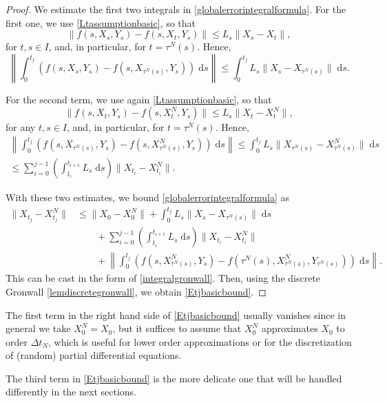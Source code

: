 \documentclass[reqno,12pt]{amsart}
\theoremstyle{plain} %
\theoremstyle{definition} %
\begin{document}
\begin{proof}
    We estimate the first two integrals in \eqref{globalerrorintegralformula}. For the first one, we use \eqref{Ltassumptionbasic}, so that
    $$
        \|f(s, X_s, Y_s) - f(s, X_t, Y_s)\| \leq L_s \|X_s - X_t\|,
    $$
    for $t, s \in I$, and, in particular, for $t = \tau^N(s)$. Hence,
    $$
        \left\|\int_0^{t_j} \left( f(s, X_s, Y_s) - f(s, X_{\tau^N(s)}, Y_s) \right)\;\mathrm{d}s \right\| \leq \int_0^{t_j} L_s \|X_s - X_{\tau^N(s)}\| \;\mathrm{d}s.
    $$
    
    For the second term, we use again \eqref{Ltassumptionbasic}, so that
    $$
        \|f(s, X_t, Y_s) - f(s, X_t^N, Y_s)\| \leq L_s \|X_t - X_t^N\|,
    $$
    for any $t, s \in I$, and, in particular, for $t = \tau^N(s)$. Hence,
    \begin{multline*}
        \left\|\int_0^{t_j} \left( f(s, X_{\tau^N(s)}, Y_s) - f(s, X_{\tau^N(s)}^N, Y_s) \right)\;\mathrm{d}s \right\| \leq \int_0^{t_j} L_s \|X_{\tau^N(s)} - X_{\tau^N(s)}^N\| \;\mathrm{d}s \\
        \leq \sum_{i=0}^{j-1} \left(\int_{t_i}^{t_{i+1}}L_s\;\mathrm{d}s \right) \|X_{t_i} - X_{t_i}^N\|.
    \end{multline*}
    
    With these two estimates, we bound \eqref{globalerrorintegralformula} as
    \begin{align*}
        \|X_{t_j} - X_{t_j}^N\| & \leq \|X_0 - X_0^N\| + \int_0^{t_j} L_s \|X_s - X_{\tau^N(s)}\| \;\mathrm{d}s \\
        & \qquad + \sum_{i=0}^{j-1} \left(\int_{t_i}^{t_{i+1}}L_s\;\mathrm{d}s \right) \|X_{t_i} - X_{t_i}^N\| \\
        & \qquad + \left\|\int_0^{t_j} \left( f(s, X_{\tau^N(s)}^N, Y_s) - f(\tau^N(s), X_{\tau^N(s)}^N, Y_{\tau^N(s)}) \right)\;\mathrm{d}s\right\|.
    \end{align*}
    This can be cast in the form of \eqref{integralgronwall}. Then, using the discrete Gronwall \cref{lemdiscretegronwall}, we obtain \eqref{Etjbasicbound}.
\end{proof}

The first term in the right hand side of \eqref{Etjbasicbound} usually vanishes since in general we take $X_0^N = X_0$, but it suffices to assume that $X_0^N$ approximates $X_0$ to order $\Delta t_N$, which is useful for lower order approximations or for the discretization of (random) partial differential equations.

The third term in \eqref{Etjbasicbound} is the more delicate one that will be handled differently in the next sections.
\end{document}
